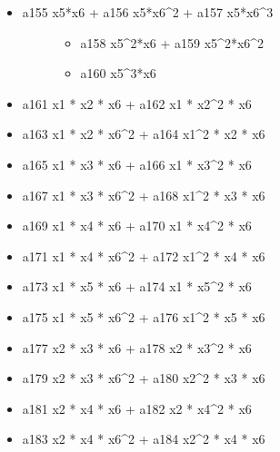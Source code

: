 \documentclass[letterpaper,10pt,english]{sphinxmanual}
\begin{document}
\begin{fulllineitems}
\begin{description}
\begin{itemize}
\item {} \begin{description}
\item[{a155 x5*x6 + a156 x5*x6\textasciicircum{}2 + a157 x5*x6\textasciicircum{}3}] \leavevmode\begin{itemize}
\item {} 
a158 x5\textasciicircum{}2*x6 + a159 x5\textasciicircum{}2*x6\textasciicircum{}2

\item {} 
a160 x5\textasciicircum{}3*x6

\end{itemize}

\end{description}

\item {} 
a161 x1 * x2 * x6 + a162 x1 * x2\textasciicircum{}2 * x6

\item {} 
a163 x1 * x2 * x6\textasciicircum{}2 + a164 x1\textasciicircum{}2 * x2 * x6

\item {} 
a165 x1 * x3 * x6 + a166 x1 * x3\textasciicircum{}2 * x6

\item {} 
a167 x1 * x3 * x6\textasciicircum{}2 + a168 x1\textasciicircum{}2 * x3 * x6

\item {} 
a169 x1 * x4 * x6 + a170 x1 * x4\textasciicircum{}2 * x6

\item {} 
a171 x1 * x4 * x6\textasciicircum{}2 + a172 x1\textasciicircum{}2 * x4 * x6

\item {} 
a173 x1 * x5 * x6 + a174 x1 * x5\textasciicircum{}2 * x6

\item {} 
a175 x1 * x5 * x6\textasciicircum{}2 + a176 x1\textasciicircum{}2 * x5 * x6

\item {} 
a177 x2 * x3 * x6 + a178 x2 * x3\textasciicircum{}2 * x6

\item {} 
a179 x2 * x3 * x6\textasciicircum{}2 + a180 x2\textasciicircum{}2 * x3 * x6

\item {} 
a181 x2 * x4 * x6 + a182 x2 * x4\textasciicircum{}2 * x6

\item {} 
a183 x2 * x4 * x6\textasciicircum{}2 + a184 x2\textasciicircum{}2 * x4 * x6


\end{itemize}
\end{description}
\end{fulllineitems}
\end{document}
